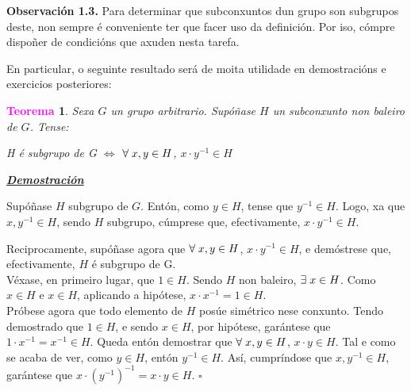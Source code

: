 \documentclass[twoside]{report}
\newcommand{\magbf}[1]{\textcolor{magenta}{\textbf{#1}}} %
\theoremstyle{mystyle}
\newtheorem{theo}{\magbf{Teorema}}[chapter]
\newenvironment{theorem}
{\begin{mdframed}[linecolor = magenta,backgroundcolor = classicrose, linewidth = 2mm]\begin{theo}}
{\end{theo}\end{mdframed}}
\begin{document}
\vspace{2mm}

\noindent \textbf{Observación 1.3.} Para determinar que subconxuntos dun grupo son subgrupos deste, non sempre é conveniente ter que facer uso da definición. Por iso, cómpre dispoñer de condicións que axuden nesta tarefa.

\noindent En particular, o seguinte resultado será de moita utilidade en demostracións e exercicios posteriores:

\vspace{1mm}

\begin{theorem} \label{th1.1}
Sexa $G$ un grupo arbitrario. Supóñase $H$ un subconxunto non baleiro de $G$. Tense: 
\begin{center}
    H é subgrupo de G $\Longleftrightarrow$ $\forall \hspace{1mm} x,y \in H$, $x \cdot y^{-1} \in H$
\end{center} 
\end{theorem}

\vspace{2mm}

\noindent \textbf{\textit{\underline{Demostración}}}

\vspace{2mm}

\noindent {} Supóñase $H$ subgrupo de $G$. Entón, como $y \in H$, tense que $y^{-1} \in H$. Logo, xa que $x,y^{-1} \in H$, sendo $H$ subgrupo, cúmprese que, efectivamente, $x \cdot y^{-1} \in H$.

\vspace{2mm}

\noindent {} Reciprocamente, supóñase agora que $\forall \hspace{1mm} x,y \in H$, $x \cdot y^{-1} \in H$, e demóstrese que, efectivamente, $H$ é subgrupo de G. \\
Véxase, en primeiro lugar, que $1 \in H$. Sendo $H$ non baleiro, $\exists \hspace{1mm} x \in H$. Como $x \in H$ e $x \in H$, aplicando a hipótese, $x \cdot x^{-1} = 1 \in H$. \\
Próbese agora que todo elemento de $H$ posúe simétrico nese conxunto. Tendo demostrado que $1 \in H$, e sendo $x \in H$, por hipótese, garántese que $1 \cdot x^{-1} = x^{-1} \in H.$ \newline
\noindent Queda entón demostrar que $\forall \hspace{1mm} x,y \in H$, $x \cdot y \in H$. Tal e como se acaba de ver, como $y \in H$, entón $y^{-1} \in H$. Así, cumpríndose que $x, y^{-1} \in H$, garántese que $x \cdot (y^{-1})^{-1} = x \cdot y \in H$. $\square$
\end{document}
